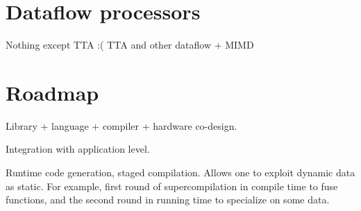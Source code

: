 \documentclass[10pt,conference]{IEEEtran}
\newcommand\todo[1]{{\color{red}#1}}
\begin{document}
\section{Dataflow processors}

\todo{Nothing except TTA :(}
TTA and other dataflow + MIMD

\section{Roadmap}

Library + language + compiler + hardware co-design.

Integration with application level.

Runtime code generation, staged compilation. 
Allows one to exploit dynamic data as static. 
For example, first round of supercompilation in compile time to fuse functions, and the second round in running time to specialize on some data. 






\end{document}
